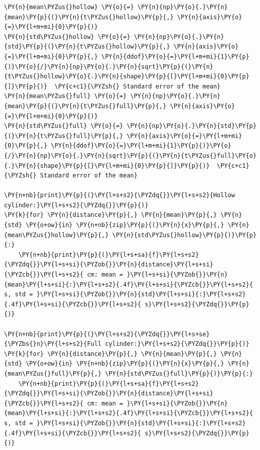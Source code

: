\begin{tcolorbox}[breakable, size=fbox, boxrule=1pt, pad at break*=1mm,colback=cellbackground, colframe=cellborder]
\begin{Verbatim}[commandchars=\\\{\}]
\PY{n}{mean\PYZus{}hollow} \PY{o}{=} \PY{n}{np}\PY{o}{.}\PY{n}{mean}\PY{p}{(}\PY{n}{t\PYZus{}hollow}\PY{p}{,} \PY{n}{axis}\PY{o}{=}\PY{l+m+mi}{0}\PY{p}{)}
\PY{n}{std\PYZus{}hollow} \PY{o}{=} \PY{n}{np}\PY{o}{.}\PY{n}{std}\PY{p}{(}\PY{n}{t\PYZus{}hollow}\PY{p}{,} \PY{n}{axis}\PY{o}{=}\PY{l+m+mi}{0}\PY{p}{,} \PY{n}{ddof}\PY{o}{=}\PY{l+m+mi}{1}\PY{p}{)}\PY{o}{/}\PY{n}{np}\PY{o}{.}\PY{n}{sqrt}\PY{p}{(}\PY{n}{t\PYZus{}hollow}\PY{o}{.}\PY{n}{shape}\PY{p}{[}\PY{l+m+mi}{0}\PY{p}{]}\PY{p}{)}  \PY{c+c1}{\PYZsh{} Standard error of the mean}
\PY{n}{mean\PYZus{}full} \PY{o}{=} \PY{n}{np}\PY{o}{.}\PY{n}{mean}\PY{p}{(}\PY{n}{t\PYZus{}full}\PY{p}{,} \PY{n}{axis}\PY{o}{=}\PY{l+m+mi}{0}\PY{p}{)}
\PY{n}{std\PYZus{}full} \PY{o}{=} \PY{n}{np}\PY{o}{.}\PY{n}{std}\PY{p}{(}\PY{n}{t\PYZus{}full}\PY{p}{,} \PY{n}{axis}\PY{o}{=}\PY{l+m+mi}{0}\PY{p}{,} \PY{n}{ddof}\PY{o}{=}\PY{l+m+mi}{1}\PY{p}{)}\PY{o}{/}\PY{n}{np}\PY{o}{.}\PY{n}{sqrt}\PY{p}{(}\PY{n}{t\PYZus{}full}\PY{o}{.}\PY{n}{shape}\PY{p}{[}\PY{l+m+mi}{0}\PY{p}{]}\PY{p}{)}  \PY{c+c1}{\PYZsh{} Standard error of the mean}

\PY{n+nb}{print}\PY{p}{(}\PY{l+s+s2}{\PYZdq{}}\PY{l+s+s2}{Hollow cylinder:}\PY{l+s+s2}{\PYZdq{}}\PY{p}{)}
\PY{k}{for} \PY{n}{distance}\PY{p}{,} \PY{n}{mean}\PY{p}{,} \PY{n}{std} \PY{o+ow}{in} \PY{n+nb}{zip}\PY{p}{(}\PY{n}{x}\PY{p}{,} \PY{n}{mean\PYZus{}hollow}\PY{p}{,} \PY{n}{std\PYZus{}hollow}\PY{p}{)}\PY{p}{:}
    \PY{n+nb}{print}\PY{p}{(}\PY{l+s+sa}{f}\PY{l+s+s2}{\PYZdq{}}\PY{l+s+si}{\PYZob{}}\PY{n}{distance}\PY{l+s+si}{\PYZcb{}}\PY{l+s+s2}{ cm: mean = }\PY{l+s+si}{\PYZob{}}\PY{n}{mean}\PY{l+s+si}{:}\PY{l+s+s2}{.4f}\PY{l+s+si}{\PYZcb{}}\PY{l+s+s2}{ s, std = }\PY{l+s+si}{\PYZob{}}\PY{n}{std}\PY{l+s+si}{:}\PY{l+s+s2}{.4f}\PY{l+s+si}{\PYZcb{}}\PY{l+s+s2}{ s}\PY{l+s+s2}{\PYZdq{}}\PY{p}{)}

\PY{n+nb}{print}\PY{p}{(}\PY{l+s+s2}{\PYZdq{}}\PY{l+s+se}{\PYZbs{}n}\PY{l+s+s2}{Full cylinder:}\PY{l+s+s2}{\PYZdq{}}\PY{p}{)}
\PY{k}{for} \PY{n}{distance}\PY{p}{,} \PY{n}{mean}\PY{p}{,} \PY{n}{std} \PY{o+ow}{in} \PY{n+nb}{zip}\PY{p}{(}\PY{n}{x}\PY{p}{,} \PY{n}{mean\PYZus{}full}\PY{p}{,} \PY{n}{std\PYZus{}full}\PY{p}{)}\PY{p}{:}
    \PY{n+nb}{print}\PY{p}{(}\PY{l+s+sa}{f}\PY{l+s+s2}{\PYZdq{}}\PY{l+s+si}{\PYZob{}}\PY{n}{distance}\PY{l+s+si}{\PYZcb{}}\PY{l+s+s2}{ cm: mean = }\PY{l+s+si}{\PYZob{}}\PY{n}{mean}\PY{l+s+si}{:}\PY{l+s+s2}{.4f}\PY{l+s+si}{\PYZcb{}}\PY{l+s+s2}{ s, std = }\PY{l+s+si}{\PYZob{}}\PY{n}{std}\PY{l+s+si}{:}\PY{l+s+s2}{.4f}\PY{l+s+si}{\PYZcb{}}\PY{l+s+s2}{ s}\PY{l+s+s2}{\PYZdq{}}\PY{p}{)}
\end{Verbatim}
\end{tcolorbox}

